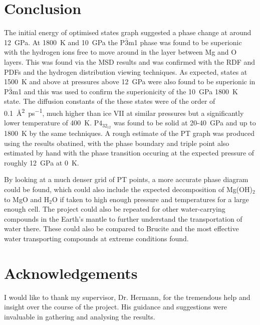 \documentclass[a4paper,12pt]{article}
\begin{document}
 
\section{Conclusion}
%
The initial energy of optimised states graph suggested a phase change at around \SI{12}{\GPa}. At \SI{1800}{\K} and \SI{10}{\GPa} the P$\bar3$m1 phase was found to be superionic with the hydrogen ions free to move around in the layer between Mg and O layers. This was found via the MSD results and was confirmed with the RDF and PDFs and the hydrogen distribution viewing techniques. As expected, states at \SI{1500}{\K} and above at pressures above \SI{12}{\GPa} were also found to be superionic in P$\bar3$m1 and this was used to confirm the superionicity of the \SI{10}{\GPa} \SI{1800}{\K} state. The diffusion constants of the these states were of the order of \SI{0.1}{\AA^2\per\pico\second}, much higher than ice VII at similar pressures but a significantly lower temperature of \SI{400}{\K}. P$4_32_12$ was found to be solid at 20-\SI{40}{\GPa} and up to \SI{1800}{\K} by the same techniques. A rough estimate of the PT graph was produced using the results obatined, with the phase boundary and triple point also estimated by hand with the phase transition occuring at the expected pressure of roughly \SI{12}{\GPa} at \SI{0}{\K}.

By looking at a much denser grid of PT points, a more accurate phase diagram could be found, which could also include the expected decomposition of Mg(OH)$_2$ to MgO and H$_2$O if taken to high enough pressure and temperatures for a large enough cell. The project could also be repeated for other water-carrying compounds in the Earth's mantle to further understand the transportation of water there. These could also be compared to Brucite and the most effective water transporting compounds at extreme conditions found.


\section{Acknowledgements}
I would like to thank my supervisor, Dr. Hermann, for the tremendous help and insight over the course of the project. His guidance and suggestions were invaluable in gathering and analysing the results.
\end{document}
